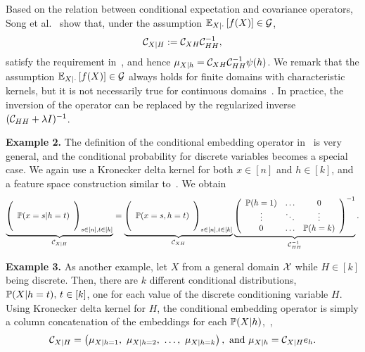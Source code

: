\documentclass{article}
\begin{document}
Based on the relation between conditional expectation and covariance operators, Song et al. \, \cite{SonHuaSmoFuk09} show that, under the assumption $\mathbb{E}_{X|\cdot} \left[f(X)\right]\in\mathcal{G}$,
\begin{align}
    \label{eq:conditionalembeddingoperator}
    \mathcal{C}_{X|H}:=\mathcal{C}_{XH}\mathcal{C}_{HH}^{-1},
\end{align}
satisfy the requirement in~, and
hence $\mu_{X|h} = \mathcal{C}_{XH} \mathcal{C}_{HH}^{-1} \psi(h)$.
We remark that the assumption $\mathbb{E}_{X|\cdot} \left[f(X)\right]\in\mathcal{G}$ always holds for finite domains with characteristic kernels, but it is not necessarily true for continuous domains~\cite{FukBacJor04}.
In practice, the inversion of the operator can be replaced by the regularized inverse $(\mathcal{C}_{HH}+\lambda I)^{-1}$.

{\bf Example 2.} The definition of the conditional embedding operator in~ is very general, and the conditional probability for discrete variables becomes a special case. We again use a Kronecker delta kernel for both $x\in [n]$ and $h\in [k]$, and a feature space construction similar to~. We obtain
\begin{align}
    \underbrace{\rbr{
        \begin{array}{c}
            \cr
            \PP(x=s|h=t) \cr
            \cr
        \end{array}
    }_{s\in[n],t\in[k]}}_{\Ccal_{X|H}}
    =
    \underbrace{
    \rbr{
        \begin{array}{c}
            \cr
            \PP(x=s, h=t) \cr
            \cr
        \end{array}
    }_{s\in[n],t\in[k]}}_{\Ccal_{XH}}
    \underbrace{
    \rbr{
        \begin{array}{ccc}
            \PP(h=1) & \ldots & 0 \cr
            \vdots &  \ddots & \vdots \cr
            0 & \ldots & \PP(h=k)
        \end{array}
    }^{\Large -1}}_{\Ccal_{HH}^{-1}}. \label{eq:conditionalprobabilitytable}
\end{align}

{\bf Example 3.} As another example, let $X$ from a general domain $\mathcal{X}$ while $H\in[k]$ being discrete. Then, there are $k$ different conditional distributions, $\mathbb{P}(X|h=t),\,t\in[k]$, one for each value of the discrete conditioning variable $H$. Using Kronecker delta kernel for $H$, the conditional embedding operator is simply a column concatenation of the embeddings for each $\mathbb{P}(X|h)$,~\ie,
\begin{align}
  \Ccal_{X|H} = \rbr{\mu_{X|h=1},\ \mu_{X|h=2},\ \ldots,\ \mu_{X|h=k}},~\text{and}~\mu_{X|h} = \Ccal_{X|H} e_h.
\end{align}
\end{document}

